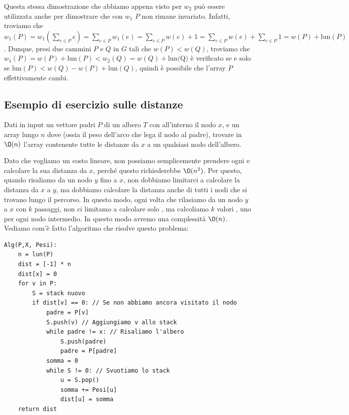 \documentclass[11pt, a4paper, titlepage, oneside]{scrbook}
\begin{document}
Questa stessa dimostrazione che abbiamo appena visto per $w_2$ può essere utilizzata anche per dimostrare che con $w_1$ $P$ non rimane invariato. Infatti, troviamo che \mbox{$w_1(P) = w_1(\sum_{e \in P} e) = \sum_{e \in P} w_1(e) = \sum_{e \in P} w(e) + 1 = \sum_{e \in P} w(e) + \sum_{e \in P} 1 = w(P) + \text{lun}(P)$}. Dunque, presi due cammini $P$ e $Q$ in $G$ tali che $w(P) < w(Q)$, troviamo che $w_1(P) = w(P) + \text{lun}(P) < w_2(Q) = w(Q) + \text{lun(Q)}$ è verificato se e solo se $\text{lun}(P) < w(Q) - w(P) + \text{lun}(Q)$, quindi è possibile che l'array $P$ effettivamente cambi.

\subsection{Esempio di esercizio sulle distanze}

Dati in input un vettore padri $P$ di un albero $T$ con all'interno il nodo $x$, e un array  lungo $n$ dove  (ossia il peso dell'arco che lega il nodo al padre), trovare in $\O(n)$ l'array  contenente tutte le distanze da $x$ a un qualsiasi nodo dell'albero.

Dato che vogliamo un costo lineare, non possiamo semplicemente prendere ogni e calcolare la sua distanza da $x$, perché questo richiederebbe $\O(n^2)$. Per questo, quando risaliamo da un nodo $y$ fino a $x$, non dobbiamo limitarci a calcolare la distanza da $x$ a $y$, ma dobbiamo calcolare la distanza anche di tutti i nodi che si trovano lungo il percorso. In questo modo, ogni volta che rilasiamo da un nodo $y$ a $x$ con $k$ passaggi, non ci limitamo a calcolare solo , ma calcoliamo $k$ valori , uno per ogni nodo intermedio. In questo modo avremo una complessità $\O(n)$. Vediamo com'è fatto l'algoritmo che risolve questo problema:

\begin{lstlisting}
Alg(P,X, Pesi):
    n = lun(P)
    dist = [-1] * n
    dist[x] = 0
    for v in P:
        S = stack nuovo
        if dist[v] == 0: // Se non abbiamo ancora visitato il nodo
            padre = P[v]
            S.push(v) // Aggiungiamo v allo stack
            while padre != x: // Risaliamo l'albero
                S.push(padre)
                padre = P[padre]
            somma = 0
            while S != 0: // Svuotiamo lo stack
                u = S.pop()
                somma += Pesi[u]
                dist[u] = somma
    return dist
\end{lstlisting}
\end{document}
